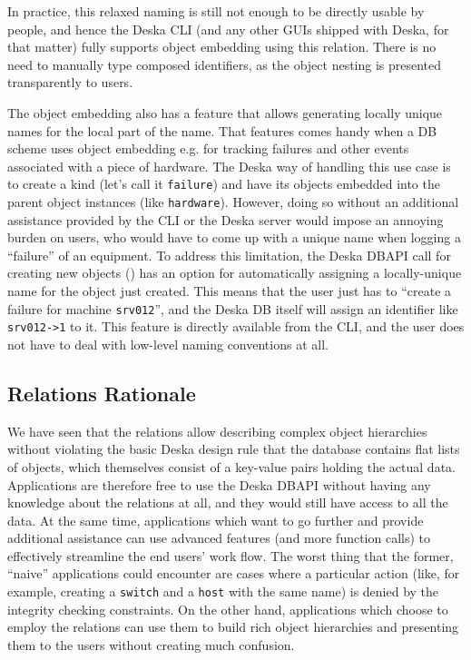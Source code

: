 \documentclass[deska]{subfiles}
\begin{document}
In practice, this relaxed naming is still not enough to be directly usable by people, and hence the Deska CLI (and any
other GUIs shipped with Deska, for that matter) fully supports object embedding using this relation.  There is no need
to manually type composed identifiers, as the object nesting is presented transparently to users.

The object embedding also has a feature that allows generating locally unique names for the local part of the name.
That features comes handy when a DB scheme uses object embedding e.g. for tracking failures and other events associated
with a piece of hardware.  The Deska way of handling this use case is to create a kind (let's call it {\tt failure}) and
have its objects embedded into the parent object instances (like {\tt hardware}).  However, doing so without an
additional assistance provided by the CLI or the Deska server would impose an annoying burden on users, who would have
to come up with a unique name when logging a ``failure'' of an equipment.  To address this limitation, the Deska DBAPI
call for creating new objects () has an option for automatically assigning a locally-unique
name for the object just created.  This means that the user just has to ``create a failure for machine {\tt srv012}'',
and the Deska DB itself will assign an identifier like {\tt srv012->1} to it.  This feature is directly available from
the CLI, and the user does not have to deal with low-level naming conventions at all.

\subsection{Relations Rationale}

We have seen that the relations allow describing complex object hierarchies without violating the basic Deska design
rule that the database contains flat lists of objects, which themselves consist of a key-value pairs holding the actual
data.  Applications are therefore free to use the Deska DBAPI without having any knowledge about the relations at all,
and they would still have access to all the data.  At the same time, applications which want to go further and provide
additional assistance can use advanced features (and more function calls) to effectively streamline the end users' work
flow.  The worst thing that the former, ``naive'' applications could encounter are cases where a particular action
(like, for example, creating a {\tt switch} and a {\tt host} with the same name) is denied by the integrity checking
constraints.  On the other hand, applications which choose to employ the relations can use them to build rich object
hierarchies and presenting them to the users without creating much confusion.
\end{document}
